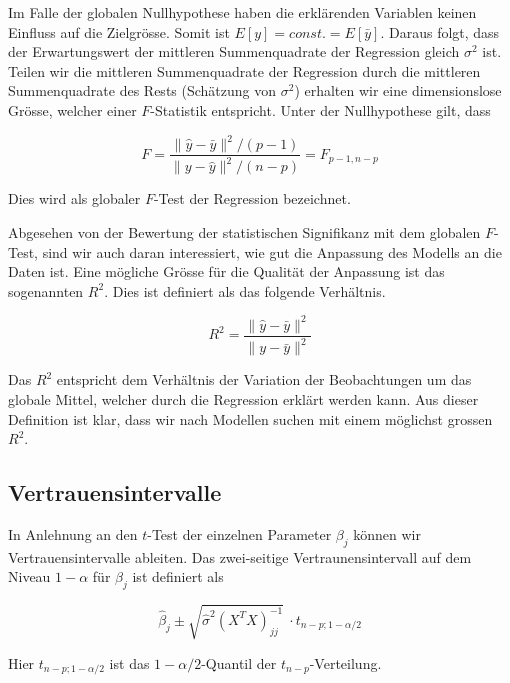 \documentclass[]{book}
\begin{document}
Im Falle der globalen Nullhypothese haben die erklärenden Variablen
keinen Einfluss auf die Zielgrösse. Somit ist
\(E\left[y \right] = const. = E\left[\bar{y}\right]\). Daraus folgt,
dass der Erwartungswert der mittleren Summenquadrate der Regression
gleich \(\sigma^2\) ist. Teilen wir die mittleren Summenquadrate der
Regression durch die mittleren Summenquadrate des Rests (Schätzung von
\(\sigma^2\)) erhalten wir eine dimensionslose Grösse, welcher einer
\(F\)-Statistik entspricht. Unter der Nullhypothese gilt, dass

\begin{equation}F = \frac{\|\hat{y} - \bar{y}\|^2/(p-1)}{\|y - \hat{y}\|^2/(n-p)} = F_{p-1,n-p}\end{equation}

Dies wird als globaler \(F\)-Test der Regression bezeichnet.

Abgesehen von der Bewertung der statistischen Signifikanz mit dem
globalen \(F\)-Test, sind wir auch daran interessiert, wie gut die
Anpassung des Modells an die Daten ist. Eine mögliche Grösse für die
Qualität der Anpassung ist das sogenannten \(R^2\). Dies ist definiert
als das folgende Verhältnis.

\begin{equation}R^2 = \frac{\|\hat{y} - \bar{y}\|^2}{\|y - \bar{y}\|^2}\end{equation}

Das \(R^2\) entspricht dem Verhältnis der Variation der Beobachtungen um
das globale Mittel, welcher durch die Regression erklärt werden kann.
Aus dieser Definition ist klar, dass wir nach Modellen suchen mit einem
möglichst grossen \(R^2\).

\subsection{Vertrauensintervalle}\label{vertrauensintervalle}

In Anlehnung an den \(t\)-Test der einzelnen Parameter \(\beta_j\)
können wir Vertrauensintervalle ableiten. Das zwei-seitige
Vertraunensintervall auf dem Niveau \(1-\alpha\) für \(\beta_j\) ist
definiert als

\begin{equation}\hat{\beta}_j \pm \sqrt{\hat{\sigma}^2(X^TX)_{jj}^{-1}} \ \cdot t_{n-p;1-\alpha/2}\end{equation}

Hier \(t_{n-p;1-\alpha/2}\) ist das \(1-\alpha/2\)-Quantil der
\(t_{n-p}\)-Verteilung.
\end{document}
